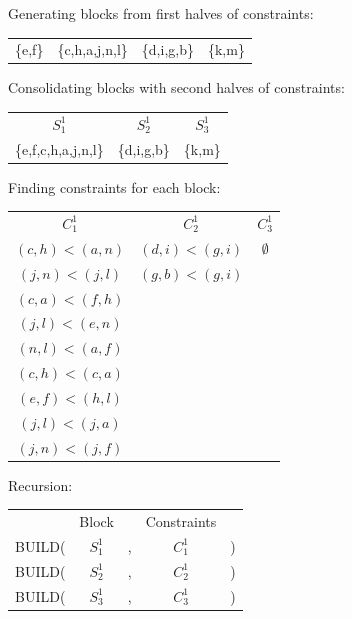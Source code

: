 \documentclass[11pt]{article} %
\begin{document}
\subsubsection{}
	\begin{center}
	Generating blocks from first halves of constraints:
	
	\begin{tabular}{c c c c}
		\{e,f\} & \{c,h,a,j,n,l\} & \{d,i,g,b\} & \{k,m\}
	\end{tabular}
	
	Consolidating blocks with second halves of constraints:
	
	\begin{tabular}{c c c}
		\hspace{0.8cm}$S_1^1$\hspace{0.8cm} & \hspace{0.8cm}$S_2^1$\hspace{0.8cm} & \hspace{0.8cm}$S_3^1$\hspace{0.8cm} \\
		\{e,f,c,h,a,j,n,l\} & \{d,i,g,b\} & \{k,m\}
	\end{tabular}
	
	Finding constraints for each block:
	
	\begin{tabular}{c c c}
		\hspace{0.8cm}$C_1^1$\hspace{0.8cm} & \hspace{0.8cm}$C_2^1$\hspace{0.8cm} & \hspace{0.8cm}$C_3^1$\hspace{0.8cm} \\
		$(c,h)<(a,n)$ & $(d,i)<(g,i)$ & $\emptyset$ \\
		$(j,n)<(j,l)$ & $(g,b)<(g,i)$ \\
		$(c,a)<(f,h)$ \\
		$(j,l)<(e,n)$ \\
		$(n,l)<(a,f)$ \\
		$(c,h)<(c,a)$ \\
		$(e,f)<(h,l)$ \\
		$(j,l)<(j,a)$ \\
		$(j,n)<(j,f)$ \\
	\end{tabular}

	Recursion:
	
	\begin{tabular}{c c c c c}
		 & Block & & Constraints & \\
		BUILD( & $S_1^1$ & , & $C_1^1$ & ) \\
		BUILD( & $S_2^1$ & , & $C_2^1$ & ) \\
		BUILD( & $S_3^1$ & , & $C_3^1$ & )
	\end{tabular}
	\end{center}
\end{document}
